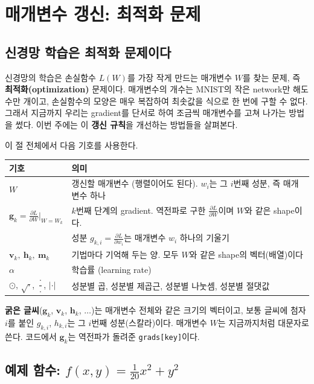 \documentclass[11pt,a4paper]{article}
\newcommand{\pd}[2]{\frac{\partial #1}{\partial #2}}
\begin{document}
\section{매개변수 갱신: 최적화 문제}

\subsection{신경망 학습은 최적화 문제이다}

신경망의 학습은 손실함수 $L(W)$를 가장 작게 만드는 매개변수 $W$를 찾는 문제,
즉 \textbf{최적화(optimization)} 문제이다.
매개변수의 개수는 MNIST의 작은 network만 해도 수만 개이고, 손실함수의 모양은 매우 복잡하여
최솟값을 식으로 한 번에 구할 수 없다.
그래서 지금까지 우리는 gradient를 단서로 하여 조금씩 매개변수를 고쳐 나가는 방법을 썼다.
이번 주에는 이 \textbf{갱신 규칙}을 개선하는 방법들을 살펴본다.

이 절 전체에서 다음 기호를 사용한다.
\begin{center}
\begin{tabular}{@{}ll@{}}
\toprule
기호 & 의미 \\
\midrule
$W$ & 갱신할 매개변수 (행렬이어도 된다). $w_i$는 그 $i$번째 성분, 즉 매개변수 하나 \\[3pt]
$\bm g_k=\pd{L}{W}\Big|_{W=W_k}$ & $k$번째 단계의 gradient. 역전파로 구한 $\pd{L}{W}$이며 $W$와 같은 shape이다. \\
& 성분 $g_{k,i}=\pd{L}{w_i}$는 매개변수 $w_i$ 하나의 기울기 \\[3pt]
$\bm v_k,\ \bm h_k,\ \bm m_k$ & 기법마다 기억해 두는 양. 모두 $W$와 같은 shape의 벡터(배열)이다 \\[3pt]
$\alpha$ & 학습률 (learning rate) \\
$\odot$, $\sqrt{\cdot}$, $\dfrac{\cdot}{\cdot}$, $|\cdot|$ & 성분별 곱, 성분별 제곱근, 성분별 나눗셈, 성분별 절댓값 \\
\bottomrule
\end{tabular}
\end{center}
\textbf{굵은 글씨}($\bm g_k$, $\bm v_k$, $\bm h_k$, $\ldots$)는 매개변수 전체와 같은 크기의 벡터이고,
보통 글씨에 첨자 $i$를 붙인 $g_{k,i}$, $h_{k,i}$는 그 $i$번째 성분(스칼라)이다.
매개변수 $W$는 지금까지처럼 대문자로 쓴다.
코드에서 $\bm g_k$는 역전파가 돌려준 \texttt{grads[key]}이다.

\subsection{예제 함수: $f(x,y)=\frac{1}{20}x^2+y^2$}\label{sec:example}
\end{document}
